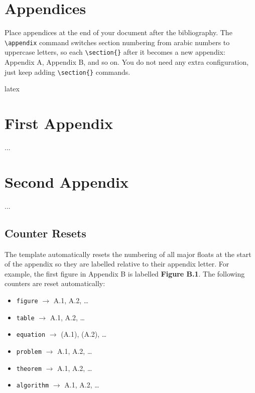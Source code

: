 \clearpage
\section{Appendices}\label{sec:appendix-supp}

Place appendices at the end of your document after the bibliography. The \texttt{\textbackslash appendix} command switches section numbering from arabic numbers to uppercase letters, so each \texttt{\textbackslash section\{\}} after it becomes a new appendix: Appendix A, Appendix B, and so on. You do not need any extra configuration, just keep adding \texttt{\textbackslash section\{\}} commands.

{\vspace{10pt}
	\vspace{-4pt}}
\begin{codelisting}{latex}
	\appendix
	\section{First Appendix}   %
	...
	\section{Second Appendix}  %
	...
\end{codelisting}

	\subsection{Counter Resets}
	The template automatically resets the numbering of all major floats at the start of the appendix so they are labelled relative to their appendix letter. For example, the first figure in Appendix B is labelled \textbf{Figure B.1}. The following counters are reset automatically:
	
	\begin{itemize}[noitemsep]
		\item \texttt{figure} $\rightarrow$ A.1, A.2, \ldots
		\item \texttt{table} $\rightarrow$ A.1, A.2, \ldots
		\item \texttt{equation} $\rightarrow$ (A.1), (A.2), \ldots
		\item \texttt{problem} $\rightarrow$ A.1, A.2, \ldots
		\item \texttt{theorem} $\rightarrow$ A.1, A.2, \ldots
		\item \texttt{algorithm} $\rightarrow$ A.1, A.2, \ldots
	\end{itemize}
	
